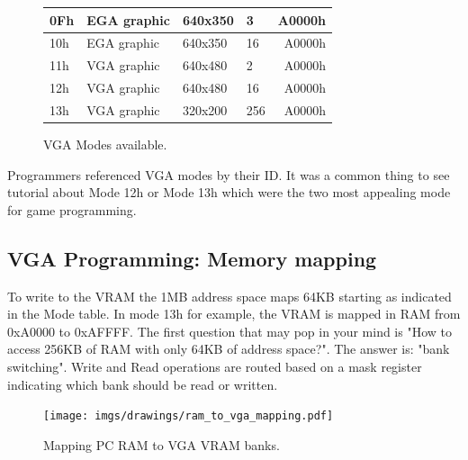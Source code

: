 \documentclass[book.tex]{subfiles}
\begin{document}
\begin{figure}[H]
\begin{table}[H]
\begin{tabularx}{\textwidth}[c]{llllr}
0Fh           & EGA graphic   & 640x350         & 3                        & A0000h                                \\ \hline
10h           & EGA graphic   & 640x350         & 16                       & A0000h                                \\ \hline
11h           & VGA graphic   & 640x480         & 2                        & A0000h                                \\ \hline
12h           & VGA graphic   & 640x480         & 16                       & A0000h                                \\ \hline
13h           & VGA graphic   & 320x200         & 256                      & A0000h                                \\ \hline
\end{tabularx}
\end{table}
\caption{VGA Modes available.}\label{fig:vga_modes}
 \end{figure}
 
 Programmers referenced VGA modes by their ID. It was a common thing to see tutorial about Mode 12h or Mode 13h which were the two most appealing mode for game programming.


 \subsection{VGA Programming: Memory mapping}
To write to the VRAM the 1MB address space maps 64KB starting as indicated in the Mode table. In mode 13h for example, the VRAM is mapped in RAM from 0xA0000 to 0xAFFFF. The first question that may pop in your mind is "How to access 256KB of RAM with only 64KB of address space?". The answer is: "bank switching". Write and Read operations are routed based on a mask register indicating which bank should be read or written.\\
\par
 \begin{figure}[H]
\centering
  
      \texttt{[image: imgs/drawings/ram\_to\_vga\_mapping.pdf]}
    
\caption{Mapping PC RAM to VGA VRAM banks.}
\end{figure}



 
\end{document}
